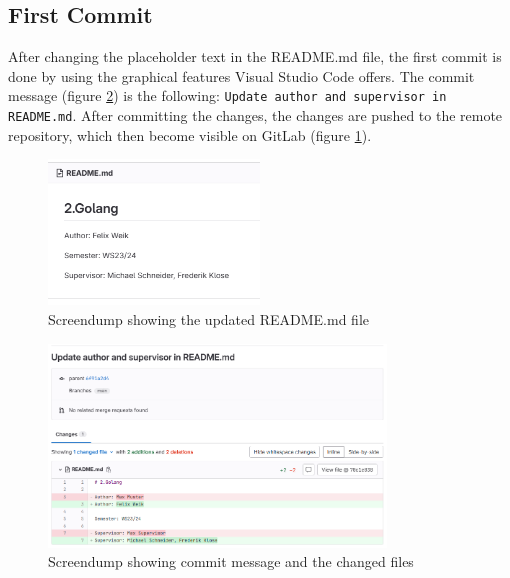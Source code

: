 \subsection*{First Commit}
After changing the placeholder text in the README.md file, the first commit is done by using the graphical features Visual Studio Code offers.
The commit message (figure \ref*{fig:screendump_readmeCommitMessage}) is the following: \texttt{Update author and supervisor in README.md}.
After committing the changes, the changes are pushed to the remote repository, which then become visible on GitLab (figure \ref*{fig:screendump_readme}).

\begin{figure}[h]
    \centering
    \includegraphics[width=0.5\textwidth]{figures/goLang/golang_screendumpReadme.png}
    \caption{Screendump showing the updated README.md file}
    \label{fig:screendump_readme}
\end{figure}

\begin{figure}[h]
    \centering
    \includegraphics[width=0.8\textwidth]{figures/goLang/golang_screendumpReadmeCommit.png}
    \caption{Screendump showing commit message and the changed files}
    \label{fig:screendump_readmeCommitMessage}
\end{figure}